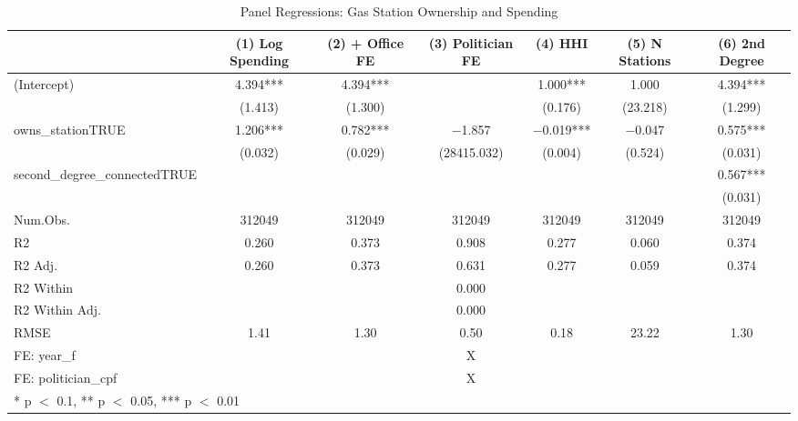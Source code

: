 \begin{table}
\centering
\caption{Panel Regressions: Gas Station Ownership and Spending}
\centering
\begin{tabular}[t]{lcccccc}
\toprule
  & (1) Log Spending & (2) + Office FE & (3) Politician FE & (4) HHI & (5) N Stations & (6) 2nd Degree\\
\midrule
(Intercept) & \num{4.394}*** & \num{4.394}*** &  & \num{1.000}*** & \num{1.000} & \num{4.394}***\\
 & (\num{1.413}) & (\num{1.300}) &  & (\num{0.176}) & (\num{23.218}) & (\num{1.299})\\
owns\_stationTRUE & \num{1.206}*** & \num{0.782}*** & \num{-1.857} & \num{-0.019}*** & \num{-0.047} & \num{0.575}***\\
 & (\num{0.032}) & (\num{0.029}) & (\num{28415.032}) & (\num{0.004}) & (\num{0.524}) & (\num{0.031})\\
second\_degree\_connectedTRUE &  &  &  &  &  & \num{0.567}***\\
 &  &  &  &  &  & (\num{0.031})\\
\midrule
Num.Obs. & \num{312049} & \num{312049} & \num{312049} & \num{312049} & \num{312049} & \num{312049}\\
R2 & \num{0.260} & \num{0.373} & \num{0.908} & \num{0.277} & \num{0.060} & \num{0.374}\\
R2 Adj. & \num{0.260} & \num{0.373} & \num{0.631} & \num{0.277} & \num{0.059} & \num{0.374}\\
R2 Within &  &  & \num{0.000} &  &  & \\
R2 Within Adj. &  &  & \num{0.000} &  &  & \\
RMSE & \num{1.41} & \num{1.30} & \num{0.50} & \num{0.18} & \num{23.22} & \num{1.30}\\
FE: year\_f &  &  & X &  &  & \\
FE: politician\_cpf &  &  & X &  &  & \\
\bottomrule
\multicolumn{7}{l}{\rule{0pt}{1em}* p $<$ 0.1, ** p $<$ 0.05, *** p $<$ 0.01}\\
\end{tabular}
\end{table}
